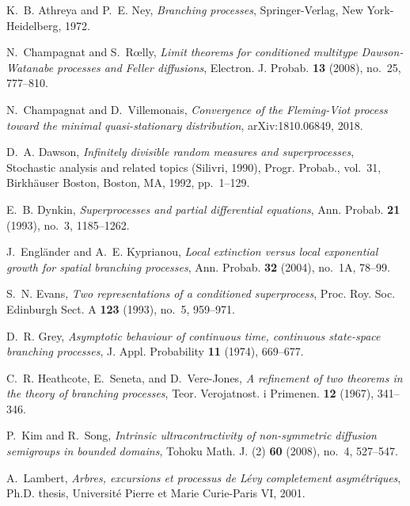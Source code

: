 \documentclass[12pt,a4paper]{amsart}
\theoremstyle{plain}
\theoremstyle{definition}
\numberwithin{equation}{section}
\begin{document}
\begin{thebibliography}{10}

K.~B. Athreya and P.~E. Ney, \emph{Branching processes}, Springer-Verlag, New
  York-Heidelberg, 1972.

N.~Champagnat and S.~R{\oe}lly, \emph{Limit theorems for conditioned multitype
  {D}awson-{W}atanabe processes and {F}eller diffusions}, Electron. J. Probab.
  \textbf{13} (2008), no.~25, 777--810.

N.~Champagnat and D.~Villemonais, \emph{Convergence of the {F}leming-{V}iot
  process toward the minimal quasi-stationary distribution}, arXiv:1810.06849,
  2018.

D.~A. Dawson, \emph{Infinitely divisible random measures and superprocesses},
  Stochastic analysis and related topics ({S}ilivri, 1990), Progr. Probab.,
  vol.~31, Birkh\"{a}user Boston, Boston, MA, 1992, pp.~1--129.

E.~B. Dynkin, \emph{Superprocesses and partial differential equations}, Ann.
  Probab. \textbf{21} (1993), no.~3, 1185--1262.

J.~Engl\"{a}nder and A.~E. Kyprianou, \emph{Local extinction versus local
  exponential growth for spatial branching processes}, Ann. Probab. \textbf{32}
  (2004), no.~1A, 78--99.

S.~N. Evans, \emph{Two representations of a conditioned superprocess}, Proc.
  Roy. Soc. Edinburgh Sect. A \textbf{123} (1993), no.~5, 959--971.

D.~R. Grey, \emph{Asymptotic behaviour of continuous time, continuous
  state-space branching processes}, J. Appl. Probability \textbf{11} (1974),
  669--677.

C.~R. Heathcote, E.~Seneta, and D.~Vere-Jones, \emph{A refinement of two
  theorems in the theory of branching processes}, Teor. Verojatnost. i
  Primenen. \textbf{12} (1967), 341--346.

P.~Kim and R.~Song, \emph{Intrinsic ultracontractivity of non-symmetric
  diffusion semigroups in bounded domains}, Tohoku Math. J. (2) \textbf{60}
  (2008), no.~4, 527--547.

A.~Lambert, \emph{Arbres, excursions et processus de {L}\'{e}vy completement
  asym\'{e}triques}, Ph.D. thesis, Universit\'{e} Pierre et Marie Curie-Paris
  VI, 2001.


\end{thebibliography}
\end{document}
